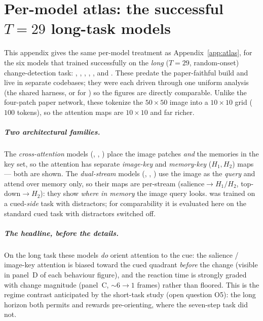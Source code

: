 \chapter{Per-model atlas: the successful \texorpdfstring{$T=29$}{T=29} long-task models}
\label{app:atlas_t29}

This appendix gives the same per-model treatment as Appendix~\ref{app:atlas}, for the six
models that trained successfully on the \emph{long} ($T=29$, random-onset) change-detection
task: , , , , , and
. These predate the paper-faithful build and live in separate codebases;
they were each driven through one uniform analysis (the shared  harness,
or  for ) so the figures are directly comparable. Unlike
the four-patch paper network, these tokenize the $50\times50$ image into a $10\times10$ grid
($100$ tokens), so the attention maps are $10\times10$ and far richer.

\paragraph{Two architectural families.} The \emph{cross-attention} models (,
, ) place the image patches \emph{and} the memories in the key set,
so the attention has separate \emph{image-key} and \emph{memory-key} ($H_1,H_2$) maps --- both
are shown. The \emph{dual-stream} models (, , )
use the image as the \emph{query} and attend over memory only, so their maps are per-stream
(salience$\to H_1/H_2$, top-down$\to H_2$): they show \emph{where in memory} the image query
looks.  was trained on a cued-\emph{side} task with distractors; for
comparability it is evaluated here on the standard cued task with distractors switched off.

\paragraph{The headline, before the details.} On the long task these models \emph{do} orient
attention to the cue: the salience / image-key attention is biased toward the cued quadrant
\emph{before} the change (visible in panel~D of each behaviour figure), and the reaction time
is strongly graded with change magnitude (panel~C, $\sim$$6\to1$ frames) rather than floored.
This is the regime contrast anticipated by the short-task study (open question O5): the long
horizon both permits and rewards pre-orienting, where the seven-step task did not.

